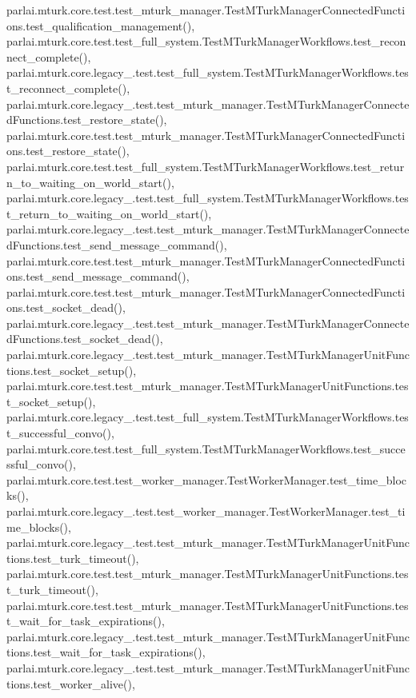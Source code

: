 parlai.\+mturk.\+core.\+test.\+test\+\_\+mturk\+\_\+manager.\+Test\+M\+Turk\+Manager\+Connected\+Functions.\+test\+\_\+qualification\+\_\+management(), parlai.\+mturk.\+core.\+test.\+test\+\_\+full\+\_\+system.\+Test\+M\+Turk\+Manager\+Workflows.\+test\+\_\+reconnect\+\_\+complete(), parlai.\+mturk.\+core.\+legacy\+\_.\+test.\+test\+\_\+full\+\_\+system.\+Test\+M\+Turk\+Manager\+Workflows.\+test\+\_\+reconnect\+\_\+complete(), parlai.\+mturk.\+core.\+legacy\+\_.\+test.\+test\+\_\+mturk\+\_\+manager.\+Test\+M\+Turk\+Manager\+Connected\+Functions.\+test\+\_\+restore\+\_\+state(), parlai.\+mturk.\+core.\+test.\+test\+\_\+mturk\+\_\+manager.\+Test\+M\+Turk\+Manager\+Connected\+Functions.\+test\+\_\+restore\+\_\+state(), parlai.\+mturk.\+core.\+test.\+test\+\_\+full\+\_\+system.\+Test\+M\+Turk\+Manager\+Workflows.\+test\+\_\+return\+\_\+to\+\_\+waiting\+\_\+on\+\_\+world\+\_\+start(), parlai.\+mturk.\+core.\+legacy\+\_.\+test.\+test\+\_\+full\+\_\+system.\+Test\+M\+Turk\+Manager\+Workflows.\+test\+\_\+return\+\_\+to\+\_\+waiting\+\_\+on\+\_\+world\+\_\+start(), parlai.\+mturk.\+core.\+legacy\+\_.\+test.\+test\+\_\+mturk\+\_\+manager.\+Test\+M\+Turk\+Manager\+Connected\+Functions.\+test\+\_\+send\+\_\+message\+\_\+command(), parlai.\+mturk.\+core.\+test.\+test\+\_\+mturk\+\_\+manager.\+Test\+M\+Turk\+Manager\+Connected\+Functions.\+test\+\_\+send\+\_\+message\+\_\+command(), parlai.\+mturk.\+core.\+test.\+test\+\_\+mturk\+\_\+manager.\+Test\+M\+Turk\+Manager\+Connected\+Functions.\+test\+\_\+socket\+\_\+dead(), parlai.\+mturk.\+core.\+legacy\+\_.\+test.\+test\+\_\+mturk\+\_\+manager.\+Test\+M\+Turk\+Manager\+Connected\+Functions.\+test\+\_\+socket\+\_\+dead(), parlai.\+mturk.\+core.\+legacy\+\_.\+test.\+test\+\_\+mturk\+\_\+manager.\+Test\+M\+Turk\+Manager\+Unit\+Functions.\+test\+\_\+socket\+\_\+setup(), parlai.\+mturk.\+core.\+test.\+test\+\_\+mturk\+\_\+manager.\+Test\+M\+Turk\+Manager\+Unit\+Functions.\+test\+\_\+socket\+\_\+setup(), parlai.\+mturk.\+core.\+legacy\+\_.\+test.\+test\+\_\+full\+\_\+system.\+Test\+M\+Turk\+Manager\+Workflows.\+test\+\_\+successful\+\_\+convo(), parlai.\+mturk.\+core.\+test.\+test\+\_\+full\+\_\+system.\+Test\+M\+Turk\+Manager\+Workflows.\+test\+\_\+successful\+\_\+convo(), parlai.\+mturk.\+core.\+test.\+test\+\_\+worker\+\_\+manager.\+Test\+Worker\+Manager.\+test\+\_\+time\+\_\+blocks(), parlai.\+mturk.\+core.\+legacy\+\_.\+test.\+test\+\_\+worker\+\_\+manager.\+Test\+Worker\+Manager.\+test\+\_\+time\+\_\+blocks(), parlai.\+mturk.\+core.\+legacy\+\_.\+test.\+test\+\_\+mturk\+\_\+manager.\+Test\+M\+Turk\+Manager\+Unit\+Functions.\+test\+\_\+turk\+\_\+timeout(), parlai.\+mturk.\+core.\+test.\+test\+\_\+mturk\+\_\+manager.\+Test\+M\+Turk\+Manager\+Unit\+Functions.\+test\+\_\+turk\+\_\+timeout(), parlai.\+mturk.\+core.\+test.\+test\+\_\+mturk\+\_\+manager.\+Test\+M\+Turk\+Manager\+Unit\+Functions.\+test\+\_\+wait\+\_\+for\+\_\+task\+\_\+expirations(), parlai.\+mturk.\+core.\+legacy\+\_.\+test.\+test\+\_\+mturk\+\_\+manager.\+Test\+M\+Turk\+Manager\+Unit\+Functions.\+test\+\_\+wait\+\_\+for\+\_\+task\+\_\+expirations(), parlai.\+mturk.\+core.\+legacy\+\_.\+test.\+test\+\_\+mturk\+\_\+manager.\+Test\+M\+Turk\+Manager\+Unit\+Functions.\+test\+\_\+worker\+\_\+alive(), 